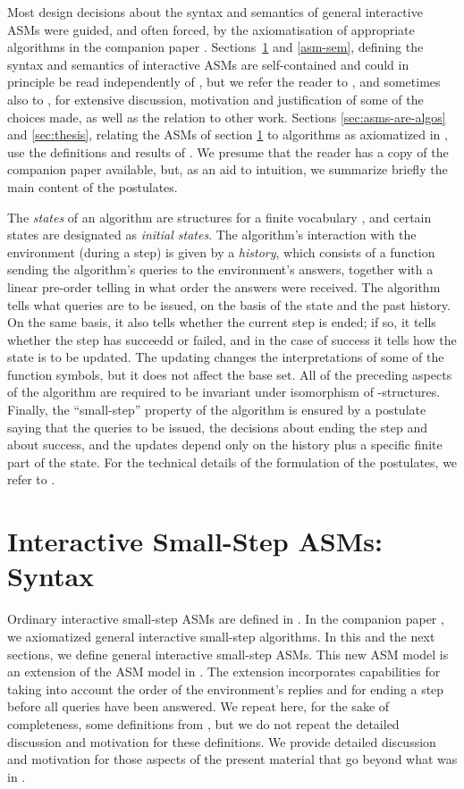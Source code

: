 \documentclass{LMCS}
\theoremstyle{definition}
\begin{document}
Most design decisions about the syntax and semantics of general
interactive ASMs were guided, and often forced, by the axiomatisation
of appropriate algorithms in the companion paper \cite{ga1}.
Sections~\ref{sec:asm} and \ref{asm-sem}, defining the syntax and semantics of
interactive ASMs are self-contained and could in principle be read
independently of \cite{ga1}, but we refer the reader to \cite{ga1},
and sometimes also to \cite{oa1,oa2,oa3}, for extensive discussion,
motivation and justification of some of the choices made, as well as
the relation to other work.  Sections \ref{sec:asms-are-algos} and
\ref{sec:thesis}, relating the ASMs of section \ref{sec:asm} to
algorithms as axiomatized in \cite{ga1}, use the definitions and
results of \cite{ga1}.  We presume that the reader has a copy of the
companion paper \cite{ga1} available, but, as an aid to intuition, we
summarize briefly the main content of the postulates.

The \emph{states} of an algorithm are structures for a finite
vocabulary , and certain states are designated as
\emph{initial states}.  The algorithm's interaction with the
environment (during a step) is given by a \emph{history}, which
consists of a function sending the algorithm's queries to the
environment's answers, together with a linear pre-order telling in
what order the answers were received.  The algorithm tells what
queries are to be issued, on the basis of the state and the past
history.  On the same basis, it also tells whether the current step is
ended; if so, it tells whether the step has succeedd or failed, and in
the case of success it tells how the state is to be updated.  The
updating changes the interpretations of some of the function symbols,
but it does not affect the base set.  All of the preceding aspects of
the algorithm are required to be invariant under isomorphism of
-structures.  Finally, the ``small-step'' property of the
algorithm is ensured by a postulate saying that the queries to be
issued, the decisions about ending the step and about success, and the
updates depend only on the history plus a specific finite part of the
state.  For the technical details of the formulation of the
postulates, we refer to \cite[Section~3]{ga1}.

\section{Interactive Small-Step ASMs: Syntax}   \label{sec:asm}

Ordinary interactive small-step ASMs are defined in \cite{oa2}.  In the
companion paper \cite{ga1}, we axiomatized general interactive
small-step algorithms.  In this and the next sections, we define general
interactive small-step ASMs.  This new ASM model is an extension of the
ASM model in \cite{oa2}.  The extension incorporates capabilities for
taking into account the order of the environment's replies and for ending
a step before all queries have been answered.  We repeat here, for the
sake of completeness, some definitions from \cite{oa2,ga1}, but we do not
repeat the detailed discussion and motivation for these definitions.  We
provide detailed discussion and motivation for those aspects of the
present material that go beyond what was in \cite{oa2,ga1}.
\end{document}
